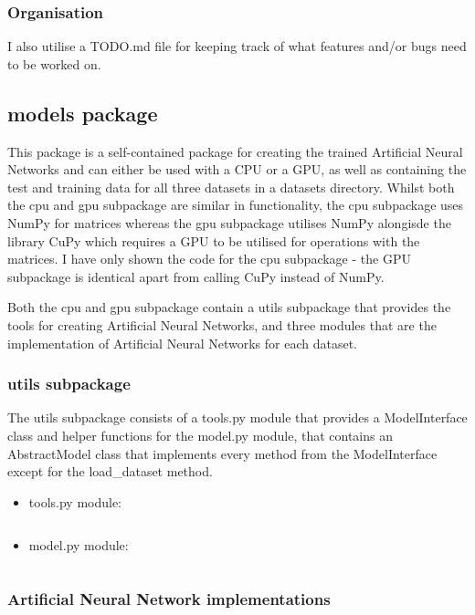 \documentclass[./project-report/src/latex/project-report.tex]{subfiles}
\begin{document}
\subsubsection{Organisation}

I also utilise a TODO.md file for keeping track of what features and/or bugs need to be worked on.

\subsection{models package}

This package is a self-contained package for creating the trained Artificial Neural Networks and can either be used with a CPU or a GPU, as well as containing the test 
and training data for all three datasets in a datasets directory. Whilst both the cpu and gpu subpackage are similar in functionality, the cpu subpackage uses NumPy 
for matrices whereas the gpu subpackage utilises NumPy alongisde the library CuPy which requires a GPU to be utilised for operations with the matrices. I have only shown the 
code for the cpu subpackage - the GPU subpackage is identical apart from calling CuPy instead of NumPy.

Both the cpu and gpu subpackage contain a utils subpackage that provides the tools for creating Artificial Neural Networks, and three modules that are the implementation 
of Artificial Neural Networks for each dataset.

\subsubsection{utils subpackage}
\label{sec:utils-subpackage}

The utils subpackage consists of a tools.py module that provides a ModelInterface class and helper functions for the model.py module, that contains an AbstractModel 
class that implements every method from the ModelInterface except for the load\_dataset method.

\begin{itemize}
    \item tools.py module:
        \inputminted{python}{./school_project/models/cpu/utils/tools.py}
    \item model.py module:
        \label{sec:model-module}
        \inputminted{python}{./school_project/models/cpu/utils/model.py}
\end{itemize}

\subsubsection{Artificial Neural Network implementations}
\label{sec:ann-implementations}
\end{document}
